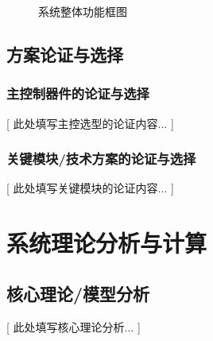 \documentclass[zihao=-4,fontset=none]{ctexart}
\begin{document}
\begin{figure}[H]
	\centering
	\caption{系统整体功能框图}
	\label{fig:system_block}
\end{figure}

\subsection{方案论证与选择}
\subsubsection{主控制器件的论证与选择}
    [ 此处填写主控选型的论证内容... ]

\subsubsection{关键模块/技术方案的论证与选择}
    [ 此处填写关键模块的论证内容... ]

\section{系统理论分析与计算}
\subsection{核心理论/模型分析}
    [ 此处填写核心理论分析... ]
    
    
\end{document}
